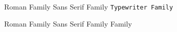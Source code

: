 \documentclass{ctexart} %
\begin{document}
	\textrm{Roman Family} \textsf{Sans Serif Family} \texttt{Typewriter Family}
	
	\rmfamily Roman Family {\sffamily Sans Serif Family} {\ttfamilyTypewriter Family}
	
\end{document}

